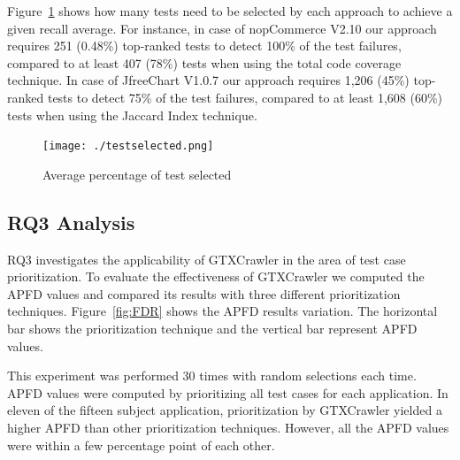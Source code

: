 Figure~\ref{fig:testselected} shows how many tests need to be selected
by each approach to achieve a given recall average. For instance, in
case of nopCommerce V2.10 our approach requires 251 (0.48\%) 
top-ranked tests to detect 100\%
of the test failures, compared to at least 407 (78\%) tests
when using the total code coverage technique. 
In case of JfreeChart V1.0.7 our approach requires
1,206 (45\%) top-ranked tests to detect 75\% of the 
test failures, compared to at least 1,608 (60\%) tests when using
the Jaccard Index technique.

\begin{figure}[!ht]
	\centering
	\texttt{[image: ./testselected.png]}
	\vspace*{-3pt}
	\caption{Average percentage of test selected}
	\label{fig:testselected}
\end{figure}



\subsection{RQ3 Analysis}

RQ3 investigates the applicability of GTXCrawler
in the area of test case prioritization. 
To evaluate the effectiveness of GTXCrawler
we computed the APFD values and compared its 
results with three different prioritization techniques.
Figure~\ref{fig:FDR} shows the APFD results variation.
The horizontal bar shows the prioritization technique
and the vertical bar represent APFD values. 


This experiment was performed 30 times with 
random selections each time. 
APFD values were computed by prioritizing all 
test cases for each application. 
In eleven of the fifteen subject application, prioritization 
by GTXCrawler yielded a higher APFD than other
prioritization techniques.
However, all the APFD values were within a few percentage 
point of each other. 


